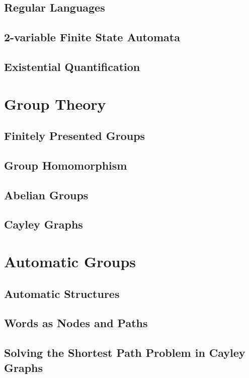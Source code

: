 \subsection{Regular Languages}

\subsection{2-variable Finite State Automata}

\subsection{Existential Quantification}


\section{Group Theory}

\subsection{Finitely Presented Groups}

\subsection{Group Homomorphism}

\subsection{Abelian Groups}

\subsection{Cayley Graphs}


\section{Automatic Groups}

\subsection{Automatic Structures}

\subsection{Words as Nodes and Paths}

\subsection{Solving the Shortest Path Problem in Cayley Graphs}

